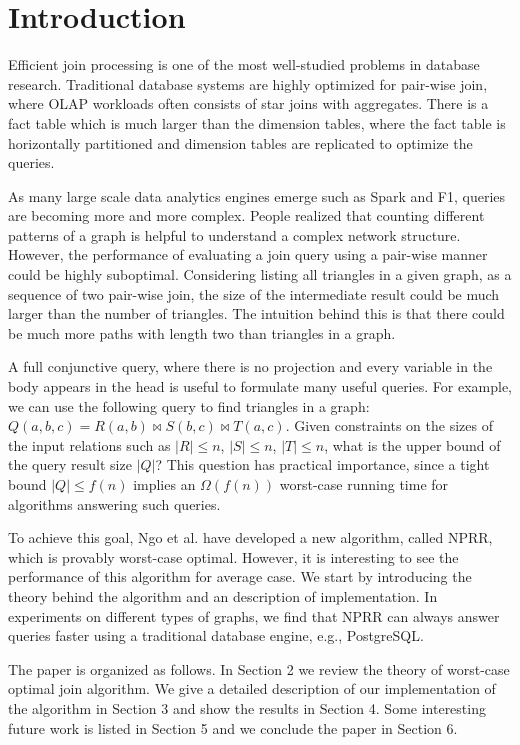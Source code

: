 \section{Introduction}

Efficient join processing is one of the most well-studied problems in database research. Traditional database systems are highly optimized for pair-wise join, where OLAP workloads often consists of star joins with aggregates. There is a fact table which is much larger than the dimension tables, where the fact table is horizontally partitioned and dimension tables are replicated to optimize the queries. 

As many large scale data analytics engines emerge such as Spark and F1, queries are becoming more and more complex. People realized that counting different patterns of a graph is helpful to understand a complex network structure. However, the performance of evaluating a join query using a pair-wise manner could be highly suboptimal. Considering listing all triangles in a given graph, as a sequence of two pair-wise join, the size of the intermediate result could be much larger than the number of triangles. The intuition behind this is that there could be much more paths with length two than triangles in a graph. 


A full conjunctive query, where there is no projection and every variable in the body appears in the head is useful to formulate many useful queries. For example, we can use the following query to find triangles in a graph: $Q(a, b, c) = R(a, b) \Join S(b, c) \Join T(a, c)$. Given constraints on the sizes of the input relations such as $|R| \leq n$, $|S| \leq n$, $|T| \leq n$, what is the upper bound of the  query result size $|Q|$? This question has practical importance, since a tight bound $|Q| \leq f(n)$ implies an $\Omega (f(n))$ worst-case running time for algorithms answering such queries.

To achieve this goal, Ngo et al. have developed a new algorithm, called NPRR, which is provably worst-case optimal. However, it is interesting to see the performance of this algorithm for average case. We start by introducing the theory behind the algorithm and an description of implementation. In experiments on different types of graphs, we find that NPRR can always answer queries faster using a traditional database engine, e.g., PostgreSQL. 
 
 
The paper is organized as follows. In Section 2 we review the theory of worst-case optimal join algorithm. We give a detailed description of our implementation of the algorithm in Section 3 and show the results in Section 4. Some interesting future work is listed in Section 5 and we conclude the paper in Section 6.
